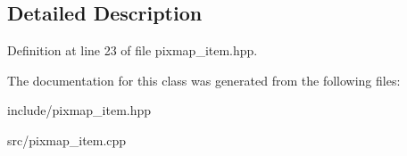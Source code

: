 \subsection{Detailed Description}


Definition at line 23 of file pixmap\+\_\+item.\+hpp.



The documentation for this class was generated from the following files\+:\begin{DoxyCompactItemize}
\item 
include/pixmap\+\_\+item.\+hpp\item 
src/pixmap\+\_\+item.\+cpp\end{DoxyCompactItemize}
